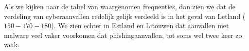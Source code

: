 \begin{question}{20}
{        Als we kijken naar de tabel van waargenomen frequenties, dan zien we dat de verdeling van cyberaanvallen redelijk gelijk verdeeld is in het geval van Letland ($150-170-180$).
        We zien echter in Estland en Litouwen dat aanvallen met malware veel vaker voorkomen dat phishingaanvallen, tot soms wel twee keer zo vaak.  
    }
\end{question}